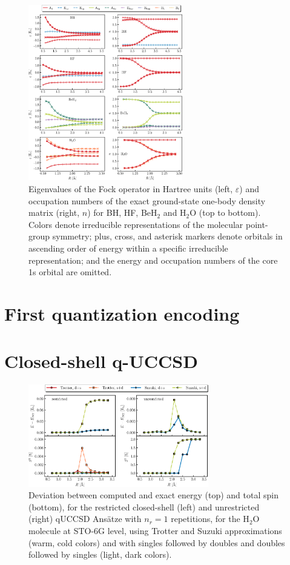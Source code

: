 \documentclass[aps,pra,twocolumn]{revtex4-2}
\begin{document}
\begin{figure}[t!]
\includegraphics[width=0.6\textwidth]{../figures/scf_fci/scf_fci.eps}
\caption{Eigenvalues of the Fock operator in Hartree units (left, $\varepsilon$) and occupation numbers of the exact ground-state one-body density matrix (right, $n$) 
for BH, HF, BeH$_2$ and H$_2$O (top to bottom). 
Colors denote irreducible representations of the molecular point-group symmetry;
plus, cross, and asterisk markers denote orbitals in ascending order of energy within a specific irreducible representation;
and the energy and occupation numbers of the core 1s orbital are omitted.}
\label{figure:scf}
\end{figure}

\section{First quantization encoding}
\label{sec:first}

\section{Closed-shell q-UCCSD}
\label{sec:cc_trotter}

\begin{figure}[t!]
\includegraphics[width=0.7\textwidth]{../figures/qUCCSD_flavors/quccsd_reps_1.eps}
\caption{Deviation between computed and exact energy (top) and total spin (bottom), for the restricted closed-shell (left) and unrestricted (right) qUCCSD Ans\"{a}tze with $n_r=1$ repetitions, for the H$_2$O molecule at STO-6G level, using Trotter and Suzuki approximations (warm, cold colors) and with singles followed by doubles and doubles followed by singles (light, dark colors).}
\label{figure:quccsd_reps_1}
\end{figure} 
\end{document}

